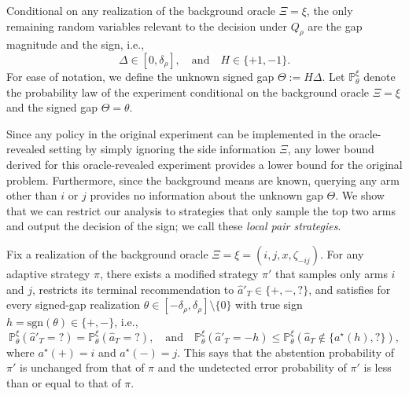\documentclass[10pt]{article}
\theoremstyle{plain}
\begin{document}
Conditional on any realization of the background oracle $\Xi = \xi$, the only remaining random variables relevant to the decision under $Q_\rho$ are the gap magnitude and the sign, i.e.,
$$\Delta \in [0, \delta_\rho], \quad\mbox{and}\quad H \in \{+1, -1\}.$$
For ease of notation, we define the unknown signed gap $\Theta := H\Delta$. Let $\mathbb{P}_\theta^\xi$ denote the probability law of the experiment conditional on the background oracle $\Xi = \xi$ and the signed gap $\Theta = \theta$.

Since any policy in the original experiment can be implemented in the oracle-revealed setting by simply ignoring the side information $\Xi$, any lower bound derived for this oracle-revealed experiment provides a lower bound for the original problem. Furthermore, since the background means are known, querying any arm other than $i$ or $j$ provides no information about the unknown gap $\Theta$. We show that we can restrict our analysis to strategies that only sample the top two arms and output the decision of the sign; we call these {\em local pair strategies}.

\begin{lemma}
\label{lem:sufficiency-local-pair-strategies}
Fix a realization of the background oracle $\Xi=\xi=(i,j,x,\zeta_{-ij})$. For any adaptive strategy $\pi$, there exists a modified strategy $\pi'$ that samples only arms $i$ and $j$, restricts its terminal recommendation to $\hat{a}'_T \in \{+,-,?\}$, and satisfies for every signed-gap realization $\theta \in [-\delta_\rho, \delta_\rho] \setminus \{0\}$ with true sign $h = \text{sgn}(\theta) \in \{+,-\}$, i.e., 
\begin{equation}
    \mathbb{P}_\theta^\xi(\hat{a}'_T = ?) = \mathbb{P}_\theta^\xi(\hat{a}_T = ?) , \quad\mbox{and}\quad
\mathbb{P}_\theta^\xi(\hat{a}'_T = -h) \le \mathbb{P}_\theta^\xi(\hat{a}_T \notin \{a^\star(h), ?\}), \label{eqn:simulate}
\end{equation}
where $a^\star(+) = i$ and $a^\star(-) = j$. This says that the abstention probability of $\pi'$ is unchanged from that of $\pi$ and the undetected error probability of $\pi'$ is less than or equal to that of $\pi$.
\end{lemma}
\end{document}
